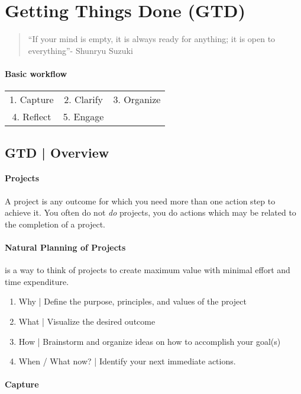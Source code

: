\section{Getting Things Done (GTD)}

\begin{quote}
	``If your mind is empty, it is always ready for anything; it is open to everything''- Shunryu Suzuki
\end{quote}

\paragraph*{Basic workflow}
\begin{tabular}{ccc}
	1. Capture & 2. Clarify  &  3. Organize\\
	4. Reflect & 5. Engage &  \\
\end{tabular}

\subsection{GTD | Overview}
\paragraph*{Projects}
A project is any outcome for which you need more than one action step to achieve it. You often do not \emph{do} projects, you do actions which may be related to the completion of a project.

\paragraph*{Natural Planning of Projects} is a way to think of projects to create maximum value with minimal effort and time expenditure.
\begin{enumerate}
\item
	Why | Define the purpose, principles, and values of the project
\item
	What | Visualize the desired outcome
\item
	How | Brainstorm and organize ideas on how to accomplish your goal(s)
\item
	When / What now? | Identify your next immediate actions.
\end{enumerate}

\paragraph*{Capture}

